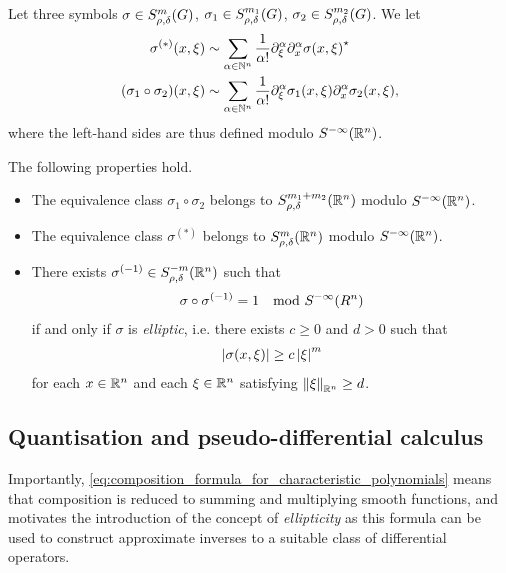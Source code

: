 \begin{theorem}
    Let three symbols
    $\sigma \in \SymbolClass m {\rho, \delta}$,
    $\sigma_1 \in \SymbolClass {m_1} {\rho, \delta}$,
    $\sigma_2 \in \SymbolClass {m_2} {\rho, \delta}$.
    We let
    \begin{align*}
        \sigma^{(*)}(x, \xi) &\sim \sum_{\alpha \in \N^n} \frac 1 {\alpha!} \iD{\xi^\alpha} \iD{x^\alpha} \adj{\sigma(x, \xi)}\\
        (\sigma_1 \circ \sigma_2)(x, \xi) &\sim \sum_{\alpha \in \N^n} \frac 1 {\alpha!} \iD{\xi^\alpha} \sigma_1(x, \xi) \iD{x^\alpha} \sigma_2(x, \xi),
    \end{align*}
    where the left-hand sides are thus defined modulo $\SmoothingSymbols [\R^n]$.

    The following properties hold.
    \begin{itemize}
        \item The equivalence class $\sigma_1 \circ \sigma_2$ belongs to $\SymbolClass [\R^n] {m_1 + m_2} {\rho, \delta}$ modulo $\SmoothingSymbols [\R^n]$.
        \item The equivalence class $\sigma^{(*)}$ belongs to $\SymbolClass [\R^n] m {\rho, \delta}$ modulo $\SmoothingSymbols [\R^n]$.
        \item
            There exists $\sigma^{(-1)} \in \SymbolClass [\R^n] {-m} {\rho, \delta}$ such that
            \begin{align*}
                \sigma \circ \sigma^{(-1)} = 1 \quad \text{mod } \SmoothingSymbols [R^n]
            \end{align*}
            if and only if $\sigma$ is \emph{elliptic},
            i.e. there exists $c \geq 0$ and $d > 0$ such that
            \begin{align*}
                \abs {\sigma(x, \xi)} \geq c \abs \xi^m
            \end{align*}
            for each $x \in \R^n$ and each $\xi \in \R^n$ satisfying $\norm [\R^n] \xi \geq d$.
    \end{itemize}
\end{theorem}

\subsection{Quantisation and pseudo-differential calculus}

Importantly,
\eqref{eq:composition_formula_for_characteristic_polynomials} means that
composition is reduced to summing and multiplying smooth functions,
and motivates the introduction of the concept of \emph{ellipticity}
as this formula can be used to construct approximate inverses to a suitable class of differential operators.

